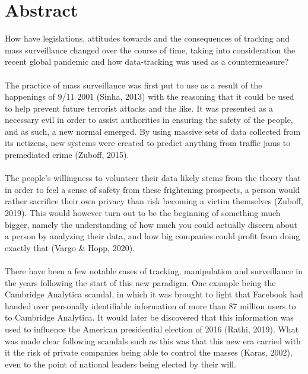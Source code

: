 \documentclass[11pt]{article}
\begin{document}
\section{Abstract}
How have legislations, attitudes towards and the consequences of tracking and mass surveillance changed over the course of time, taking into consideration the recent global pandemic and how data-tracking was used as a countermeasure? 
\\ \\
The practice of mass surveillance was first put to use as a result of the happenings of 9/11 2001 (Sinha, 2013) with the reasoning that it could be used to help prevent future terrorist attacks and the like. It was presented as a necessary evil in order to assist authorities in ensuring the safety of the people, and as such, a new normal emerged. By using massive sets of data collected from its netizens, new systems were created to predict anything from traffic jams to premediated crime (Zuboff, 2015).
\\ \\
The people’s willingness to volunteer their data likely stems from the theory that in order to feel a sense of safety from these frightening prospects, a person would rather sacrifice their own privacy than risk becoming a victim themselves (Zuboff, 2019). This would however turn out to be the beginning of something much bigger, namely the understanding of how much you could actually discern about a person by analyzing their data, and how big companies could profit from doing exactly that (Vargo \& Hopp, 2020).
\\ \\
There have been a few notable cases of tracking, manipulation and surveillance in the years following the start of this new paradigm. One example being the Cambridge Analytica scandal, in which it was brought to light that Facebook had handed over personally identifiable information of more than 87 million users to to Cambridge Analytica. It would later be discovered that this information was used to influence the American presidential election of 2016 (Rathi, 2019). What was made clear following scandals such as this was that this new era carried with it the risk of private companies being able to control the masses (Karas, 2002), even to the point of national leaders being elected by their will. 
\\ \\
\end{document}
